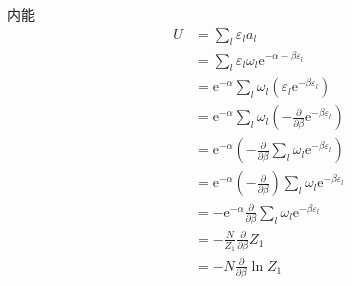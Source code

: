 内能
\begin{equation}
    \begin{aligned}
        U&=\sum_l{\varepsilon _la_l}
\\
&=\sum_l{\varepsilon _l\omega _l\mathrm{e}^{-\alpha -\beta \varepsilon _l}}
\\
&=\mathrm{e}^{-\alpha}\sum_l{\omega _l\left( \varepsilon _l\mathrm{e}^{-\beta \varepsilon _l} \right)}
\\
&=\mathrm{e}^{-\alpha}\sum_l{\omega _l\left( -\frac{\partial}{\partial \beta}\mathrm{e}^{-\beta \varepsilon _l} \right)}
\\
&=\mathrm{e}^{-\alpha}\left( -\frac{\partial}{\partial \beta}\sum_l{\omega _l\mathrm{e}^{-\beta \varepsilon _l}} \right) 
\\
&=\mathrm{e}^{-\alpha}\left( -\frac{\partial}{\partial \beta} \right) \sum_l{\omega _l\mathrm{e}^{-\beta \varepsilon _l}}
\\
&=-\mathrm{e}^{-\alpha}\frac{\partial}{\partial \beta}\sum_l{\omega _l\mathrm{e}^{-\beta \varepsilon _l}}
\\
&=-\frac{N}{Z_1}\frac{\partial}{\partial \beta}Z_1
\\
&=-N\frac{\partial}{\partial \beta}\ln Z_1
    \end{aligned}
\end{equation}



